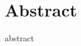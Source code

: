 \documentclass[../Elad_Kliger_Thesis.tex]{subfiles}
\begin{document}
\section*{Abstract}
    abstract
\end{document}
